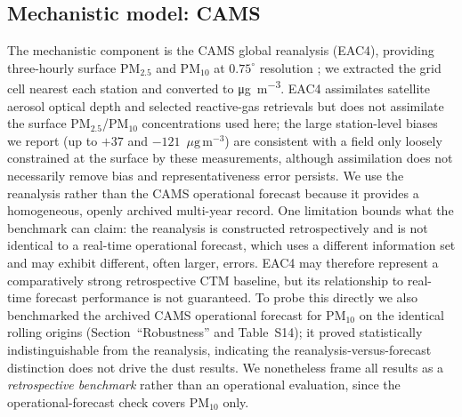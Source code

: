 \documentclass[review,times,authoryear]{elsarticle}
\newcommand*{\ugm}{\ensuremath{\mu\mathrm{g\,m^{-3}}}}
\newcommand*{\pmtf}{\ensuremath{\mathrm{PM_{2.5}}}}
\newcommand*{\pmten}{\ensuremath{\mathrm{PM_{10}}}}
\begin{document}
\subsection{Mechanistic model: CAMS}
The mechanistic component is the CAMS global reanalysis (EAC4), providing three-hourly surface \pmtf{} and \pmten{} at $0.75^\circ$ resolution \citep{inness2019,flemming2015,remy2019,benedetti2009,marecal2015}; we extracted the grid cell nearest each station and converted to \si{\micro\gram\per\cubic\metre}. EAC4 assimilates satellite aerosol optical depth and selected reactive-gas retrievals but does not assimilate the surface \pmtf{}/\pmten{} concentrations used here; the large station-level biases we report (up to $+37$ and $-121$~\ugm) are consistent with a field only loosely constrained at the surface by these measurements, although assimilation does not necessarily remove bias and representativeness error persists. We use the reanalysis rather than the CAMS operational forecast because it provides a homogeneous, openly archived multi-year record. One limitation bounds what the benchmark can claim: the reanalysis is constructed retrospectively and is not identical to a real-time operational forecast, which uses a different information set and may exhibit different, often larger, errors. EAC4 may therefore represent a comparatively strong retrospective CTM baseline, but its relationship to real-time forecast performance is not guaranteed. To probe this directly we also benchmarked the archived CAMS operational forecast for \pmten{} on the identical rolling origins (Section~``Robustness'' and Table~S14); it proved statistically indistinguishable from the reanalysis, indicating the reanalysis-versus-forecast distinction does not drive the dust results. We nonetheless frame all results as a \emph{retrospective benchmark} rather than an operational evaluation, since the operational-forecast check covers \pmten{} only.
\end{document}
